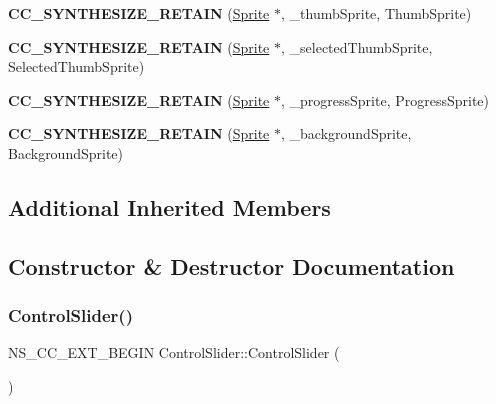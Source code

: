 \begin{DoxyCompactItemize}
\item 
\mbox{\label{classControlSlider_aeeebe247ae2d140934a907906a3495ac}} 
{\bfseries C\+C\+\_\+\+S\+Y\+N\+T\+H\+E\+S\+I\+Z\+E\+\_\+\+R\+E\+T\+A\+IN} (\hyperlink{classSprite}{Sprite} $\ast$, \+\_\+thumb\+Sprite, Thumb\+Sprite)
\item 
\mbox{\label{classControlSlider_a53bfb4f761cc224291817e7ed61147f7}} 
{\bfseries C\+C\+\_\+\+S\+Y\+N\+T\+H\+E\+S\+I\+Z\+E\+\_\+\+R\+E\+T\+A\+IN} (\hyperlink{classSprite}{Sprite} $\ast$, \+\_\+selected\+Thumb\+Sprite, Selected\+Thumb\+Sprite)
\item 
\mbox{\label{classControlSlider_accf2eeb33224f6140f4f4a2a5d162679}} 
{\bfseries C\+C\+\_\+\+S\+Y\+N\+T\+H\+E\+S\+I\+Z\+E\+\_\+\+R\+E\+T\+A\+IN} (\hyperlink{classSprite}{Sprite} $\ast$, \+\_\+progress\+Sprite, Progress\+Sprite)
\item 
\mbox{\label{classControlSlider_a45029597a1158a383ad7c495ea1af7ae}} 
{\bfseries C\+C\+\_\+\+S\+Y\+N\+T\+H\+E\+S\+I\+Z\+E\+\_\+\+R\+E\+T\+A\+IN} (\hyperlink{classSprite}{Sprite} $\ast$, \+\_\+background\+Sprite, Background\+Sprite)
\end{DoxyCompactItemize}
\subsection*{Additional Inherited Members}


\subsection{Constructor \& Destructor Documentation}
\mbox{\label{classControlSlider_a5e8f291dde316511b9fd1b59dc44bb58}} 
\subsubsection{\texorpdfstring{Control\+Slider()}{ControlSlider()}\hspace{0.1cm}{\footnotesize\ttfamily [1/2]}}
{\footnotesize\ttfamily N\+S\+\_\+\+C\+C\+\_\+\+E\+X\+T\+\_\+\+B\+E\+G\+IN Control\+Slider\+::\+Control\+Slider (\begin{DoxyParamCaption}{ }\end{DoxyParamCaption})}

